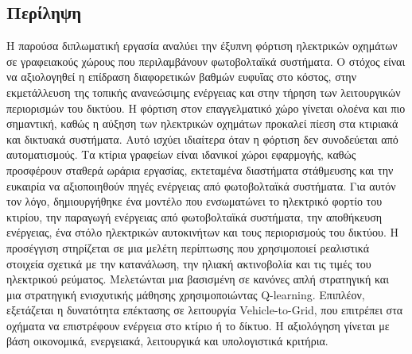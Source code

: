 \begin{greekabstract}
\chapter*{Περίληψη}

Η παρούσα διπλωματική εργασία αναλύει την έξυπνη φόρτιση ηλεκτρικών οχημάτων σε γραφειακούς χώρους που περιλαμβάνουν φωτοβολταϊκά συστήματα. Ο στόχος είναι να αξιολογηθεί η επίδραση διαφορετικών βαθμών ευφυΐας στο κόστος, στην εκμετάλλευση της τοπικής ανανεώσιμης ενέργειας και στην τήρηση των λειτουργικών περιορισμών του δικτύου. Η φόρτιση στον επαγγελματικό χώρο γίνεται ολοένα και πιο σημαντική, καθώς η αύξηση των ηλεκτρικών οχημάτων προκαλεί πίεση στα κτιριακά και δικτυακά συστήματα. Αυτό ισχύει ιδιαίτερα όταν η φόρτιση δεν συνοδεύεται από αυτοματισμούς. Τα κτίρια γραφείων είναι ιδανικοί χώροι εφαρμογής, καθώς προσφέρουν σταθερά ωράρια εργασίας, εκτεταμένα διαστήματα στάθμευσης και την ευκαιρία να αξιοποιηθούν πηγές ενέργειας από φωτοβολταϊκά συστήματα. Για αυτόν τον λόγο, δημιουργήθηκε ένα μοντέλο που ενσωματώνει το ηλεκτρικό φορτίο του κτιρίου, την παραγωγή ενέργειας από φωτοβολταϊκά συστήματα, την αποθήκευση ενέργειας, ένα στόλο ηλεκτρικών αυτοκινήτων και τους περιορισμούς του δικτύου. Η προσέγγιση στηρίζεται σε μια μελέτη περίπτωσης που χρησιμοποιεί ρεαλιστικά στοιχεία σχετικά με την κατανάλωση, την ηλιακή ακτινοβολία και τις τιμές του ηλεκτρικού ρεύματος. Μελετώνται μια βασισμένη σε κανόνες απλή στρατηγική και μια στρατηγική ενισχυτικής μάθησης χρησιμοποιώντας Q-learning. Επιπλέον, εξετάζεται η δυνατότητα επέκτασης σε λειτουργία Vehicle-to-Grid, που επιτρέπει στα οχήματα να επιστρέφουν ενέργεια στο κτίριο ή το δίκτυο. Η αξιολόγηση γίνεται με βάση οικονομικά, ενεργειακά, λειτουργικά και υπολογιστικά κριτήρια.


\end{greekabstract}
